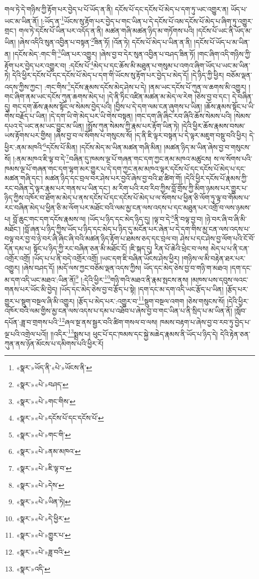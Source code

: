 གལ་ཏེ་དེ་གཉིས་ཀྱི་རྟོག་པར་བྱེད་པ་པོ་ཡོད་ན་ནི། དངོས་པོ་དང་དངོས་པོ་མེད་པ་དག་ཏུ་ཡང་འགྱུར་ན། ཡོད་པ་ཡང་མ་ཡིན་ནོ། །:ཡོད་ན་\footnote{«སྣར་»ཡོད་ནི་«པེ་»ཡོངས་ནི་}ཡོངས་སུ་རྟོག་པར་བྱེད་པ་གང་ཡིན་པ་དེ་དངོས་པོ་འམ་དངོས་པོ་མེད་པ་ཞིག་ཏུ་འགྱུར་གྲང་། གལ་ཏེ་དངོས་པོ་ཡིན་པར་འདོད་ན་ནི། མཚན་གཞི་མཚན་ཉིད་མ་གཏོགས་པའི། །དངོས་པོ་ཡང་ནི་ཡོད་མ་ཡིན། །ཞེས་འདིའི་སུན་འབྱིན་པ་བསྟན་\footnote{«སྣར་»«པེ་»བཤད་}ཟིན་ཏོ། །འོན་ཏེ། དངོས་པོ་མེད་པ་ཡིན་ན་ནི། །དངོས་པོ་ཡོད་པ་མ་ཡིན་ན། །དངོས་མེད་:གང་གི་\footnote{«སྣར་»«པེ་»གང་གིས་}ཡིན་པར་འགྱུར། །ཞེས་བྱ་བ་དེར་སུན་འབྱིན་པ་བཤད་ཟིན་ཏོ། །གང་ཞིག་འདི་གཉིས་ཀྱི་རྟོག་པར་བྱེད་པར་འགྱུར་བ། :དངོས་པོ་\footnote{«སྣར་»«པེ་»དངོས་པོ་དང་དངོས་པོ་}མེད་པ་དང་ཆོས་མི་མཐུན་པ་གསུམ་པ་འགའ་ཞིག་ཡོད་པ་ཡང་མ་ཡིན་ཏེ། དེའི་ཕྱིར་དངོས་པོ་དང་དངོས་པོ་མེད་པ་དག་གི་ཡོངས་སུ་རྟོག་པར་བྱེད་པ་མེད་དོ། །དེ་ཉིད་ཀྱི་ཕྱིར། བཅོམ་ལྡན་འདས་ཀྱིས་ཀྱང་། :གང་གིས་\footnote{«སྣར་»«པེ་»གང་གི་}དངོས་རྣམས་དངོས་མེད་ཤེས་པ་དེ། །ནམ་ཡང་དངོས་པོ་ཀུན་ལ་ཆགས་མི་འགྱུར། །གང་ཞིག་ནམ་ཡང་དངོས་ཀུན་ཆགས་མེད་པ། །དེ་ནི་ཏིང་འཛིན་མཚན་མ་མེད་ལ་རེག །ཅེས་བྱ་བ་དང་། དེ་བཞིན་དུ། གང་དག་ཆོས་རྣམས་སྟོང་ལ་སེམས་བྱེད་པའི། །བྱིས་པ་དེ་དག་ལམ་ངན་ཞུགས་པ་ཡིན། །ཆོས་རྣམས་སྟོང་པ་ཡི་གེས་བརྗོད་པ་ཡིན། །དེ་དག་ཡི་གེ་མེད་པར་ཡི་གེས་བསྟན། །གང་དག་ཞི་ཞིང་རབ་ཞིའི་ཆོས་སེམས་པའི། །སེམས་དཔའ་དེ་ཡང་ནམ་ཡང་བྱུང་མ་ཡིན། །སྤྲོས་ཀུན་སེམས་ཀྱི་རྣམ་པར་རྟོག་ཡིན་ཏེ། །དེའི་ཕྱིར་ཆོས་རྣམས་བསམ་ཡས་རྟོགས་པར་གྱིས། །ཞེས་བྱ་བ་ལ་སོགས་པ་གསུངས་སོ། །ད་ནི་ཇི་ལྟར་བསྟན་པ་དེ་ལྟར་མཇུག་བསྡུ་བའི་ཕྱིར། དེ་ཕྱིར་:ནམ་མཁའི་\footnote{«སྣར་»«པེ་»ནམ་མཁའ་}དངོས་པོ་མིན། །དངོས་མེད་མ་ཡིན་མཚན་གཞི་མིན། །མཚན་ཉིད་མ་ཡིན་ཞེས་བྱ་བ་གསུངས་སོ། །:ནམ་མཁའ་ཇི་ལྟ་བ་དེ་\footnote{«སྣར་»«པེ་»ཇི་ལྟ་བ་}བཞིན་དུ་ཁམས་ལྔ་པོ་གཞན་གང་དག་ཀྱང་ནམ་མཁའ་མཚུངས། ས་ལ་སོགས་པའི་ཁམས་ལྔ་པོ་གཞན་གང་དག་ལྷག་མར་གྱུར་པ་དེ་དག་ཀྱང་ནམ་མཁའ་ལྟར་དངོས་པོ་དང་དངོས་པོ་མེད་པ་དང་མཚན་གཞི་དང་། མཚན་ཉིད་དང་བྲལ་བར་ཤེས་པར་བྱའོ་ཞེས་བྱ་བའི་ཐ་ཚིག་གོ། །དེའི་ཕྱིར་དངོས་པོ་རྣམས་ཀྱི་རང་བཞིན་དེ་ལྟར་རྣམ་པར་གནས་པ་ཡིན་དང་། མ་རིག་པའི་རབ་རིབ་ཀྱིས་བློ་གྲོས་ཀྱི་མིག་ཉམས་པར་གྱུར་པ་ཉིད་ཀྱིས་འཁོར་བ་ཐོག་མ་མེད་པ་ནས་དངོས་པོ་དང་དངོས་པོ་མེད་པ་ལ་སོགས་པ་ཕྱིན་ཅི་ལོག་ཏུ་ལྟ་བ་གོམས་པ་རང་བཞིན་མེད་པ་ཕྱིན་ཅི་མ་ལོག་པར་མཐོང་བའི་ལམ་མྱ་ངན་ལས་འདས་པ་དང་མཐུན་པར་འགྲོ་བ་ལས་ཉམས་པ། བློ་ཆུང་གང་དག་དངོས་རྣམས་ལ། །ཡོད་པ་ཉིད་དང་མེད་ཉིད་དུ། །ལྟ་བ་དེ་\footnote{«སྣར་»«པེ་»དེས་}ནི་བལྟ་བྱ་བ། །ཉེ་བར་ཞི་བ་ཞི་མི་མཐོང་། །བློ་ཞན་པ་ཉིད་ཀྱིས་ཡོད་པ་ཉིད་དང་མེད་པ་ཉིད་དུ་མངོན་པར་ཞེན་པ་དེ་དག་གིས་མྱ་ངན་ལས་འདས་པ་བལྟ་བར་བྱ་བ་ཉེ་བར་ཞི་ཞིང་ཞི་བའི་མཚན་ཉིད་རྟོག་པ་ཐམས་ཅད་དང་བྲལ་བ། ཤེས་པ་དང་ཤེས་བྱ་ལོག་པའི་ངོ་བོ་དོན་དམ་པ། སྟོང་པ་ཉིད་ཀྱི་རང་བཞིན་ཅན་མི་མཐོང་ངོ། །ཇི་སྐད་དུ། རིན་པོ་ཆེའི་ཕྲེང་བ་ལས། མེད་པ་པ་ནི་ངན་འགྲོར་འགྲོ། །ཡོད་པ་པ་ནི་བདེ་འགྲོར་འགྲོ། །ཡང་དག་ཇི་བཞིན་ཡོངས་ཤེས་ཕྱིར། །གཉིས་ལ་མི་བརྟེན་ཐར་པར་འགྱུར། །ཞེས་བཤད་དོ། །མདོ་ལས་ཀྱང་བཅོམ་ལྡན་འདས་ཀྱིས། ཡོད་དང་མེད་ཅེས་བྱ་བ་གཉི་ག་མཐའ། །དག་དང་མ་དག་འདི་ཡང་མཐའ་:ཡིན་ནོ།\footnote{«སྣར་»«པེ་»ཡིན་ཏེ།} །:དེའི་ཕྱིར་\footnote{«སྣར་»«པེ་»དེ་ཕྱིར་}གཉི་གའི་མཐའ་ནི་རྣམ་སྤངས་ནས། །མཁས་པས་དབུས་ལའང་གནས་པར་ཡོང་མི་བྱེད། །ཡོད་དང་མེད་ཅེས་བྱ་བ་རྩོད་པ་སྟེ། །དག་དང་མ་དག་འདི་ཡང་རྩོད་པ་ཡིན། །རྩོད་པར་གྱུར་པ་སྡུག་བསྔལ་ཞི་མི་འགྱུར། །རྩོད་པ་མེད་པར་:འགྱུར་བ་\footnote{«སྣར་»«པེ་»གྱུར་པ་}སྡུག་བསྔལ་འགག །ཅེས་གསུངས་སོ། །དེའི་ཕྱིར་འཁོར་བའི་ལམ་གྱིས་མྱ་ངན་ལས་འདས་པ་དམ་པ་འཐོབ་པ་ཞེས་བྱ་བ་གང་ཡིན་པ་ནི་སྲིད་པ་མ་ཡིན་ནོ། །སློབ་དཔོན་:ཟླ་བ་གྲགས་པའི་\footnote{«སྣར་»«པེ་»ཟླ་བའི་}ཞལ་སྔ་ནས་སྦྱར་བའི་ཚིག་གསལ་བ་ལས། ཁམས་བརྟག་པ་ཞེས་བྱ་བ་རབ་ཏུ་བྱེད་པ་ལྔ་པའི་འགྲེལ་པའོ།། །།འདིར་\footnote{«སྣར་»འདི་}སྨྲས་པ། ཕུང་པོ་དང་ཁམས་དང་སྐྱེ་མཆེད་རྣམས་ནི་ཡོད་པ་ཉིད་དེ། དེའི་རྟེན་ཅན་ཀུན་ནས་ཉོན་མོངས་པ་དམིགས་པའི་ཕྱིར་རོ། 